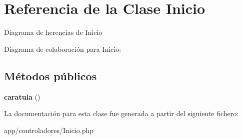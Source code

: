 \hypertarget{classInicio}{}\section{Referencia de la Clase Inicio}
\label{classInicio}


Diagrama de herencias de Inicio


Diagrama de colaboración para Inicio\+:
\subsection*{Métodos públicos}
\begin{DoxyCompactItemize}
\item 
\mbox{\label{classInicio_aaf7292c59b288964a9847de958d39de4}} 
{\bfseries caratula} ()
\end{DoxyCompactItemize}


La documentación para esta clase fue generada a partir del siguiente fichero\+:\begin{DoxyCompactItemize}
\item 
app/controladores/Inicio.\+php\end{DoxyCompactItemize}
